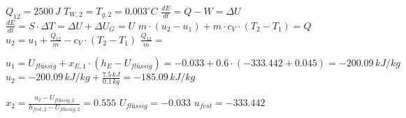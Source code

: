 \( Q_{12} = 2500 \, J \)  
\( T_{W,2} = T_{g,2} = 0.003^\circ C \)  
\( \frac{dE}{dt} = Q - W = \Delta U \)  
\( \frac{dE}{dt} = S \cdot \Delta T = \Delta U + \Delta U_G = U \)  
\( m \cdot (u_2 - u_1) + m \cdot c_V \cdot (T_2 - T_1) = Q \)  
\( u_2 = u_1 + \frac{Q_{12}}{m} - c_V \cdot (T_2 - T_1) \)  
\( \frac{Q_{12}}{m} = \)  

\( u_1 = U_{flüssig} + x_{E,1} \cdot (h_{E} - U_{flüssig}) = -0.033 + 0.6 \cdot (-333.442 + 0.045) = -200.09 \, kJ/kg \)  
\( u_2 = -200.09 \, kJ/kg + \frac{7.5 \, kJ}{0.1 \, kg} = -185.09 \, kJ/kg \)  

\( x_2 = \frac{u_2 - U_{flüssig,2}}{h_{fest,2} - U_{flüssig,2}} = 0.555 \)  
\( U_{flüssig} = -0.033 \)  
\( u_{fest} = -333.442 \)